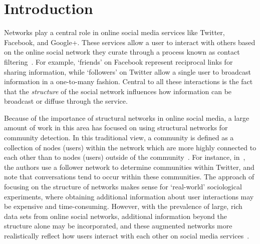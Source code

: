 \section{Introduction}

Networks play a central role in online social media services like Twitter, Facebook, and Google+. These services allow a user to interact with others based on the online social network they curate through a process known as contact filtering~\cite{cazabet2012automated}. For example, `friends' on Facebook represent reciprocal links for sharing information, while `followers' on Twitter allow a single user to broadcast information in a one-to-many fashion. Central to all these interactions is the fact that the \emph{structure} of the social network influences how information can be broadcast or diffuse through the service.

Because of the importance of structural networks in online social media, a large amount of work in this area has focused on using structural networks for community detection. In this traditional view, a community is defined as a collection of nodes (users) within the network which are more highly connected to each other than to nodes (users) outside of the community~\cite{girvan2002a, newman2004finding}. For instance, in~\cite{java2009we}, the authors use a follower network to determine communities within Twitter, and note that conversations tend to occur within these communities. The approach of focusing on the structure of networks makes sense for `real-world' sociological experiments, where obtaining additional information about user interactions may be expensive and time-consuming. However, with the prevalence of large, rich data sets from online social networks, additional information beyond the structure alone may be incorporated, and these augmented networks more realistically reflect how users interact with each other on social media services~\cite{nguyen2011adaptive,grabowicz2012social}.

